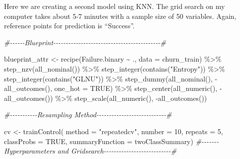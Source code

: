 \documentclass[
]{article}
\newenvironment{Shaded}{\begin{snugshade}}{\end{snugshade}}
\newcommand{\AttributeTok}[1]{\textcolor[rgb]{0.77,0.63,0.00}{#1}}
\newcommand{\CommentTok}[1]{\textcolor[rgb]{0.56,0.35,0.01}{\textit{#1}}}
\newcommand{\ConstantTok}[1]{\textcolor[rgb]{0.00,0.00,0.00}{#1}}
\newcommand{\DecValTok}[1]{\textcolor[rgb]{0.00,0.00,0.81}{#1}}
\newcommand{\FunctionTok}[1]{\textcolor[rgb]{0.00,0.00,0.00}{#1}}
\newcommand{\NormalTok}[1]{#1}
\newcommand{\OtherTok}[1]{\textcolor[rgb]{0.56,0.35,0.01}{#1}}
\newcommand{\SpecialCharTok}[1]{\textcolor[rgb]{0.00,0.00,0.00}{#1}}
\newcommand{\StringTok}[1]{\textcolor[rgb]{0.31,0.60,0.02}{#1}}
\begin{document}
Here we are creating a second model using KNN. The grid search on my
computer takes about 5-7 minutes with a sample size of 50 variables.
Again, reference points for prediction is ``Success''.

\begin{Shaded}
\begin{Highlighting}[]
\CommentTok{\#{-}{-}{-}{-}{-}{-}Blueprint{-}{-}{-}{-}{-}{-}{-}{-}{-}{-}{-}{-}{-}{-}{-}{-}{-}{-}{-}{-}{-}{-}{-}{-}{-}{-}{-}{-}{-}{-}{-}{-}{-}{-}{-}{-}{-}{-}{-}{-}{-}{-}{-}\#}

\NormalTok{blueprint\_attr }\OtherTok{\textless{}{-}} \FunctionTok{recipe}\NormalTok{(Failure.binary }\SpecialCharTok{\textasciitilde{}}\NormalTok{ ., }\AttributeTok{data =}\NormalTok{ churn\_train) }\SpecialCharTok{\%\textgreater{}\%}
  \FunctionTok{step\_nzv}\NormalTok{(}\FunctionTok{all\_nominal}\NormalTok{()) }\SpecialCharTok{\%\textgreater{}\%}
  \FunctionTok{step\_integer}\NormalTok{(}\FunctionTok{contains}\NormalTok{(}\StringTok{"Entropy"}\NormalTok{)) }\SpecialCharTok{\%\textgreater{}\%}
  \FunctionTok{step\_integer}\NormalTok{(}\FunctionTok{contains}\NormalTok{(}\StringTok{"GLNU"}\NormalTok{)) }\SpecialCharTok{\%\textgreater{}\%}
  \FunctionTok{step\_dummy}\NormalTok{(}\FunctionTok{all\_nominal}\NormalTok{(), }\SpecialCharTok{{-}}\FunctionTok{all\_outcomes}\NormalTok{(), }\AttributeTok{one\_hot =} \ConstantTok{TRUE}\NormalTok{) }\SpecialCharTok{\%\textgreater{}\%}
  \FunctionTok{step\_center}\NormalTok{(}\FunctionTok{all\_numeric}\NormalTok{(), }\SpecialCharTok{{-}}\FunctionTok{all\_outcomes}\NormalTok{()) }\SpecialCharTok{\%\textgreater{}\%}
  \FunctionTok{step\_scale}\NormalTok{(}\FunctionTok{all\_numeric}\NormalTok{(), }\SpecialCharTok{{-}}\FunctionTok{all\_outcomes}\NormalTok{())}

\CommentTok{\#{-}{-}{-}{-}{-}{-}{-}{-}{-}{-}{-}Resampling Method{-}{-}{-}{-}{-}{-}{-}{-}{-}{-}{-}{-}{-}{-}{-}{-}{-}{-}{-}{-}{-}{-}{-}{-}{-}{-}{-}{-}\#}

\NormalTok{cv }\OtherTok{\textless{}{-}} \FunctionTok{trainControl}\NormalTok{(}
  \AttributeTok{method =} \StringTok{"repeatedcv"}\NormalTok{, }
  \AttributeTok{number =} \DecValTok{10}\NormalTok{, }
  \AttributeTok{repeats =} \DecValTok{5}\NormalTok{,}
  \AttributeTok{classProbs =} \ConstantTok{TRUE}\NormalTok{,                 }
  \AttributeTok{summaryFunction =}\NormalTok{ twoClassSummary)}
\CommentTok{\#{-}{-}{-}{-}{-}{-}{-}Hyperparameters and Gridsearch{-}{-}{-}{-}{-}{-}{-}{-}{-}{-}{-}{-}{-}{-}{-}{-}{-}{-}{-}{-}{-}{-}{-}{-}{-}{-}{-}\#}


\end{Highlighting}
\end{Shaded}
\end{document}
